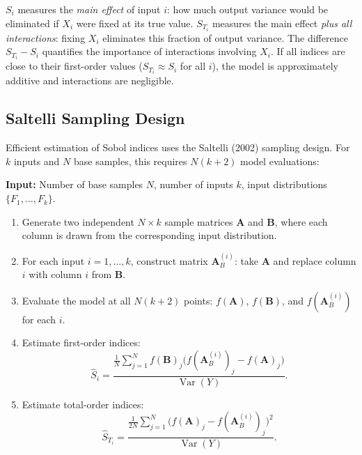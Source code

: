 \documentclass[11pt, a4paper]{article}
\theoremstyle{definition}
\theoremstyle{plain}
\theoremstyle{remark}
\begin{document}
\begin{keyidea}
$S_i$ measures the \emph{main effect} of input $i$: how much output variance
would be eliminated if $X_i$ were fixed at its true value.
$S_{T_i}$ measures the main effect \emph{plus all interactions}: fixing $X_i$
eliminates this fraction of output variance.
The difference $S_{T_i} - S_i$ quantifies the importance of interactions
involving $X_i$.
If all indices are close to their first-order values ($S_{T_i} \approx S_i$
for all $i$), the model is approximately additive and interactions are negligible.
\end{keyidea}

\subsection{Saltelli Sampling Design}

Efficient estimation of Sobol indices uses the Saltelli (2002) sampling design.
For $k$ inputs and $N$ base samples, this requires $N(k + 2)$ model evaluations:

\begin{algorithmbox}[title={Algorithm 2: Saltelli Sampling for Sobol Indices}]
\label{alg:saltelli}
\textbf{Input:} Number of base samples $N$, number of inputs $k$, input
distributions $\{F_1, \ldots, F_k\}$.
\begin{enumerate}
    \item Generate two independent $N \times k$ sample matrices $\bm{A}$ and
          $\bm{B}$, where each column is drawn from the corresponding input
          distribution.
    \item For each input $i = 1, \ldots, k$, construct matrix $\bm{A}_B^{(i)}$:
          take $\bm{A}$ and replace column $i$ with column $i$ from $\bm{B}$.
    \item Evaluate the model at all $N(k + 2)$ points:
          $f(\bm{A})$, $f(\bm{B})$, and $f(\bm{A}_B^{(i)})$ for each $i$.
    \item Estimate first-order indices:
          \begin{equation}
              \hat{S}_i = \frac{\frac{1}{N}\sum_{j=1}^{N}
              f(\bm{B})_j \bigl(f(\bm{A}_B^{(i)})_j - f(\bm{A})_j\bigr)}
              {\operatorname{Var}(Y)}.
          \end{equation}
    \item Estimate total-order indices:
          \begin{equation}
              \hat{S}_{T_i} = \frac{\frac{1}{2N}\sum_{j=1}^{N}
              \bigl(f(\bm{A})_j - f(\bm{A}_B^{(i)})_j\bigr)^2}
              {\operatorname{Var}(Y)}.
          \end{equation}
\end{enumerate}
\end{algorithmbox}
\end{document}
